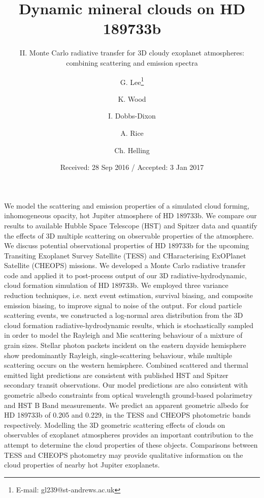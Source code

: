 \documentclass{aa}
\begin{document}
\title{Dynamic mineral clouds on HD 189733b}
\subtitle{II. Monte Carlo radiative transfer for 3D cloudy exoplanet atmospheres: combining scattering and emission spectra}
\author{G. Lee\thanks{E-mail:
gl239@st-andrews.ac.uk} \and K. Wood \and I. Dobbs-Dixon \and A. Rice  \and Ch. Helling}

\date{Received: 28 Sep 2016 / Accepted: 3 Jan 2017}

{%
We model the scattering and emission properties of a simulated cloud forming, inhomogeneous opacity, hot Jupiter atmosphere of HD 189733b.
We compare our results to available Hubble Space Telescope (HST) and Spitzer data and quantify the effects of 3D multiple scattering on observable properties of the atmosphere.
We discuss potential observational properties of HD 189733b for the upcoming Transiting Exoplanet Survey Satellite (TESS) and CHaracterising ExOPlanet Satellite (CHEOPS) missions.
}
{%
We developed a Monte Carlo radiative transfer code and applied it to post-process output of our 3D radiative-hydrodynamic, cloud formation simulation of HD 189733b.
We employed three variance reduction techniques, i.e. next event estimation, survival biasing, and composite emission biasing, to improve signal to noise of the output.
For cloud particle scattering events, we constructed a log-normal area distribution from the 3D cloud formation radiative-hydrodynamic results, which is stochastically sampled in order to model the Rayleigh and Mie scattering behaviour of a mixture of grain sizes.
}
{%
Stellar photon packets incident on the eastern dayside hemisphere show predominantly Rayleigh, single-scattering behaviour, while multiple scattering occurs on the western hemisphere.
Combined scattered and thermal emitted light predictions are consistent with published HST and Spitzer secondary transit observations.
Our model predictions are also consistent with geometric albedo constraints from optical wavelength ground-based polarimetry and HST B Band measurements.
We predict an apparent geometric albedo for HD 189733b of 0.205 and 0.229, in the TESS and CHEOPS photometric bands respectively.
}
{%
Modelling the 3D geometric scattering effects of clouds on observables of exoplanet atmospheres provides an important contribution to the attempt to determine the cloud properties of these objects.
Comparisons between TESS and CHEOPS photometry may provide qualitative information on the cloud properties of nearby hot Jupiter exoplanets.
}
\end{document}
